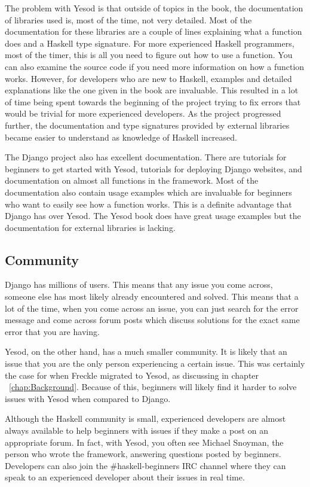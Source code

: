 The problem with Yesod is that outside of topics in the book, the documentation
of libraries used is, most of the time, not very detailed. Most of the documentation
for these libraries are a couple of lines explaining what a function does and
a Haskell type signature. For more experienced Haskell programmers, most of the
timer, this is all you need to figure out how to use a function. You can also
examine the source code if you need more information on how a function works.
However, for developers who are new to Haskell, examples and detailed explanations
like the one given in the book are invaluable. This resulted in a lot of time
being spent towards the beginning of the project trying to fix errors that would be
trivial for more experienced developers. As the project progressed further, the 
documentation and type signatures provided by external libraries became easier to 
understand as knowledge of Haskell increased.

The Django project also has excellent documentation. There are tutorials for
beginners to get started with Yesod, tutorials for deploying Django websites,
and documentation on almost all functions in the framework. Most of the
documentation also contain usage examples which are invaluable for
beginners who want to easily see how a function works. This is a definite
advantage that Django has over Yesod. The Yesod book does have great
usage examples but the documentation for external libraries is lacking.

\subsection{Community}

Django has millions of users. This means that any issue you come across,
someone else has most likely already encountered and solved. This means that
a lot of the time, when you come across an issue, you can just search for
the error message and come across forum posts which discuss solutions
for the exact same error that you are having.

Yesod, on the other hand, has a much smaller community. It is likely that
an issue that you are the only person experiencing a certain issue. This
was certainly the case for when Freckle migrated to Yesod, as discussing in
chapter ~\ref{chap:Background}. Because of this, beginners will likely find it
harder to solve issues with Yesod when compared to Django.

Although the Haskell community is small, experienced developers are almost always
available to help beginners with issues if they make a post on an appropriate
forum. In fact, with Yesod, you often see Michael Snoyman, the person who wrote
the framework, answering questions posted by beginners. Developers can also
join the \#haskell-beginners IRC channel where they can speak to an experienced
developer about their issues in real time.

